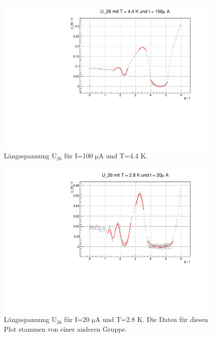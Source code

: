 \begin{figure}
\label{}
\centering
\includegraphics[scale = 0.5]{../plots/U_26_100muA_4400mK.pdf}
\caption{Längsspannung $\mathrm{U_{26}}$ für I=100 $\mathrm{\mu}$A und T=4.4 K.}
\end{figure}

\newpage

\begin{figure}
\label{}
\centering
\includegraphics[scale = 0.5]{../plots/U_26_20muA_2800mK.pdf}
\caption{Längsspannung $\mathrm{U_{26}}$ für I=20 $\mathrm{\mu}$A und T=2.8 K. Die Daten für diesen Plot stammen von einer anderen Gruppe.}
\end{figure}

